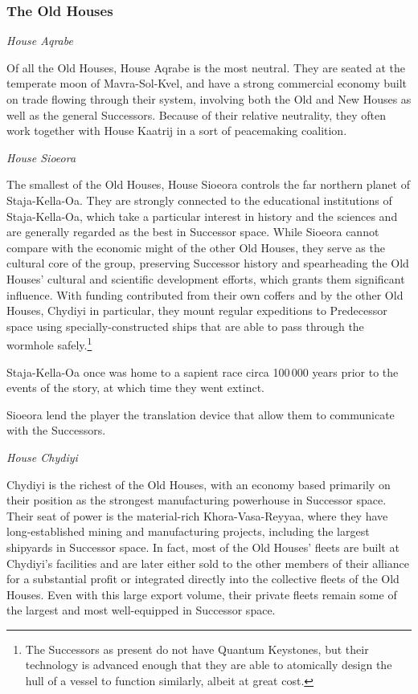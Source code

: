 \documentclass[11pt]{report}
\begin{document}
    \subsubsection{The Old Houses}

    \noindent
    \emph{House Aqrabe}

    Of all the Old Houses, House Aqrabe is the most neutral. They are seated at the temperate moon of Mavra-Sol-Kvel, and have a strong commercial economy built on trade flowing through their system, involving both the Old and New Houses as well as the general Successors. Because of their relative neutrality, they often work together with House Kaatrij in a sort of peacemaking coalition.
    \bigskip

    \noindent
    \emph{House Sioeora}

    The smallest of the Old Houses, House Sioeora controls the far northern planet of Staja-Kella-Oa. They are strongly connected to the educational institutions of Staja-Kella-Oa, which take a particular interest in history and the sciences and are generally regarded as the best in Successor space. While Sioeora cannot compare with the economic might of the other Old Houses, they serve as the cultural core of the group, preserving Successor history and spearheading the Old Houses' cultural and scientific development efforts, which grants them significant influence. With funding contributed from their own coffers and by the other Old Houses, Chydiyi in particular, they mount regular expeditions to Predecessor space using specially-constructed ships that are able to pass through the wormhole safely.\footnote{The Successors as present do not have Quantum Keystones, but their technology is advanced enough that they are able to atomically design the hull of a vessel to function similarly, albeit at great cost.}

    Staja-Kella-Oa once was home to a sapient race circa 100\,000 years prior to the events of the story, at which time they went extinct.

    Sioeora lend the player the translation device that allow them to communicate with the Successors.
    \bigskip

    \noindent
    \emph{House Chydiyi}

    Chydiyi is the richest of the Old Houses, with an economy based primarily on their position as the strongest manufacturing powerhouse in Successor space. Their seat of power is the material-rich Khora-Vasa-Reyyaa, where they have long-established mining and manufacturing projects, including the largest shipyards in Successor space. In fact, most of the Old Houses' fleets are built at Chydiyi's facilities and are later either sold to the other members of their alliance for a substantial profit or integrated directly into the collective fleets of the Old Houses. Even with this large export volume, their private fleets remain some of the largest and most well-equipped in Successor space.
\end{document}
